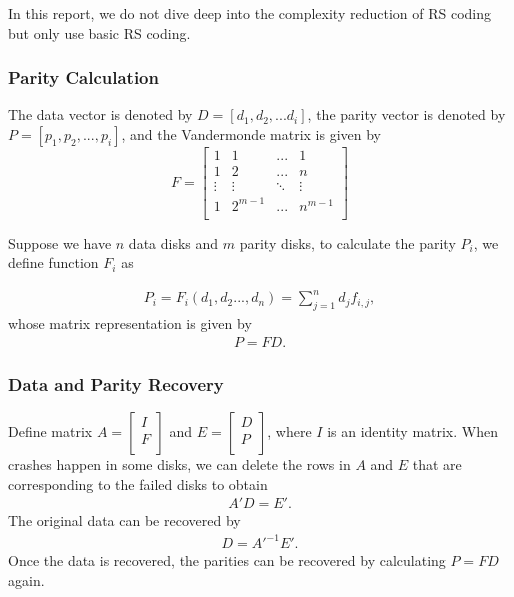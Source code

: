 \documentclass[journal]{IEEEtran}
\begin{document}
In this report, we do not dive deep into the complexity reduction of RS coding but only use basic RS coding. 
\subsubsection{Parity Calculation}
The data vector is denoted by $D=[{{d}_{1}},{{d}_{2}},...{{d}_{i}}]$, the parity vector is denoted by $P=[{{p}_{1}},{{p}_{2}},...,{{p}_{i}}]$, and the Vandermonde matrix is given by 
\begin{equation}
   F=\left[ \begin{matrix}
   1 & 1 & ... & 1  \\
   1 & 2 & ... & n  \\
   \vdots  & \vdots  & \ddots  & \vdots   \nonumber\\
   1 & {{2}^{m-1}} & ... & {{n}^{m-1}}  \\
\end{matrix} \right]
\end{equation}

Suppose we have $n$ data disks and $m$ parity disks, to calculate the parity $P_i$, we define function $F_i$ as

\begin{align}
    {{P}_{i}}={{F}_{i}}({{d}_{1}},{{d}_{2}}...,{{d}_{n}})=\sum\limits_{j=1}^{n}{{{d}_{j}}{{f}_{i,j}}},
\end{align}
whose matrix representation is given by 
\begin{align}
    P=FD.
\end{align}
\label{eq:p=fd}

\subsubsection{Data and Parity Recovery}

Define matrix  
$A=\left[ \begin{matrix}
   I  \\
   F  \\
\end{matrix} \right]$ and   
$E=\left[ \begin{matrix}
   D  \\
   P  \\
\end{matrix} \right]$, 
where $I$ is an identity matrix. 
When crashes happen in some disks, we can delete the rows in $A$ and $E$ that are corresponding to the failed disks to obtain
\begin{align}
    {A}'D={E}'.
\end{align}
The original data can be recovered by 
\begin{align}
    D={{{A}'}^{-1}}{E}'.
\end{align}
Once the data is recovered, the parities can be recovered by calculating $P=FD$ again.
\end{document}

